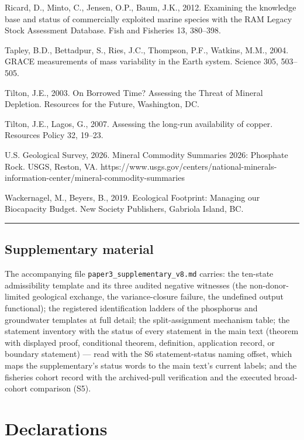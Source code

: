 \documentclass[11pt]{article}
\begin{document}
Ricard, D., Minto, C., Jensen, O.P., Baum, J.K., 2012. Examining the
knowledge base and status of commercially exploited marine species with
the RAM Legacy Stock Assessment Database. Fish and Fisheries 13,
380--398.

Tapley, B.D., Bettadpur, S., Ries, J.C., Thompson, P.F., Watkins, M.M.,
2004. GRACE measurements of mass variability in the Earth system.
Science 305, 503--505.

Tilton, J.E., 2003. On Borrowed Time? Assessing the Threat of Mineral
Depletion. Resources for the Future, Washington, DC.

Tilton, J.E., Lagos, G., 2007. Assessing the long-run availability of
copper. Resources Policy 32, 19--23.

U.S. Geological Survey, 2026. Mineral Commodity Summaries 2026:
Phosphate Rock. USGS, Reston, VA.
https://www.usgs.gov/centers/national-minerals-information-center/mineral-commodity-summaries

Wackernagel, M., Beyers, B., 2019. Ecological Footprint: Managing our
Biocapacity Budget. New Society Publishers, Gabriola Island, BC.

\begin{center}\rule{0.5\linewidth}{0.5pt}\end{center}

\subsection{Supplementary material}\label{supplementary-material}

The accompanying file \texttt{paper3\_supplementary\_v8.md} carries: the
ten-state admissibility template and its three audited negative
witnesses (the non-donor-limited geological exchange, the
variance-closure failure, the undefined output functional); the
registered identification ladders of the phosphorus and groundwater
templates at full detail; the split-assignment mechanism table; the
statement inventory with the status of every statement in the main text
(theorem with displayed proof, conditional theorem, definition,
application record, or boundary statement) --- read with the S6
statement-status naming offset, which maps the supplementary's status
words to the main text's current labels; and the fisheries cohort record
with the archived-pull verification and the executed broad-cohort
comparison (S5).

\section*{Declarations}
\end{document}
